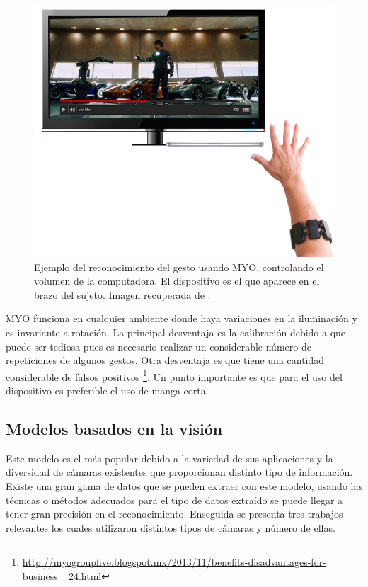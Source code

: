 \begin{figure}[h!]
\begin{center}
\includegraphics[scale=.5]{./Figures/MYO.png}
\end{center}
\caption{Ejemplo del reconocimiento del gesto usando MYO, controlando el volumen de la computadora. El dispositivo es el que aparece en el brazo del sujeto. Imagen recuperada de \protect\footnotemark{}.}
\label{fig:Myo}
\end{figure}


MYO funciona en cualquier ambiente donde haya variaciones en la iluminación y es invariante a rotación.
La principal desventaja es la calibración debido a que puede ser tediosa pues es necesario realizar un considerable número de repeticiones de algunos gestos. Otra desventaja es que tiene una cantidad considerable de falsos positivos \footnote{ \url{http://myogroupfive.blogspot.mx/2013/11/benefits-disadvantages-for-business\_ 24.html}}. Un punto importante es que para el uso del dispositivo es preferible el uso de manga corta. 


\subsection{Modelos basados en la visión}   

Este modelo es el más popular debido a la variedad de sus aplicaciones y la diversidad de cámaras existentes que proporcionan distinto tipo de información. Existe una gran gama de datos que se pueden extraer con este modelo, usando las técnicas o métodos adecuados para el tipo de datos extraído se puede llegar a tener gran precisi\'on en el reconocimiento. Enseguida se presenta tres trabajos relevantes los cuales utilizaron distintos tipos de cámaras y número de ellas. 

